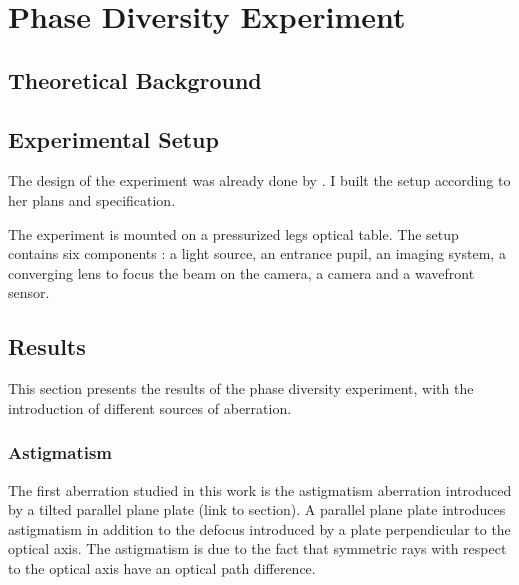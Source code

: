 
\chapter{Phase Diversity Experiment} %

\label{PDExp} %




\section{Theoretical Background}




\section{Experimental Setup}

The design of the experiment was already done by \citet{Bouxin_PDM}. I built the setup according to her plans and specification.

The experiment is mounted on a pressurized legs optical table. The setup contains six components : a light source, an entrance pupil, an imaging system, a converging lens to focus the beam on the camera, a camera and a wavefront sensor.


\section{Results}

This section presents the results of the phase diversity experiment, with the introduction of different sources of aberration.

\subsection{Astigmatism}

The first aberration studied in this work is the astigmatism aberration introduced by a tilted parallel plane plate (link to section). A parallel plane plate introduces astigmatism in addition to the defocus introduced by a plate perpendicular to the optical axis. The astigmatism is due to the fact that symmetric rays with respect to the optical axis have an optical path difference. 
